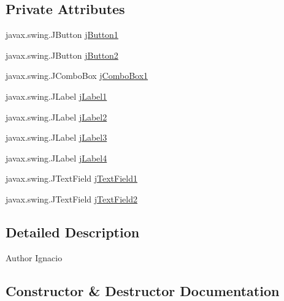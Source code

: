 \subsection*{Private Attributes}
\begin{DoxyCompactItemize}
\item 
javax.\+swing.\+J\+Button \mbox{\hyperlink{classejercicio2_1_1_camion_interfaz_a782e2170ce45db1bd1d32b61d1d7be8c}{j\+Button1}}
\item 
javax.\+swing.\+J\+Button \mbox{\hyperlink{classejercicio2_1_1_camion_interfaz_aa5f586a69f5266a210a12f6873d21657}{j\+Button2}}
\item 
javax.\+swing.\+J\+Combo\+Box \mbox{\hyperlink{classejercicio2_1_1_camion_interfaz_ad99726150fad438267d353b48c6aaf7d}{j\+Combo\+Box1}}
\item 
javax.\+swing.\+J\+Label \mbox{\hyperlink{classejercicio2_1_1_camion_interfaz_a490011dc597ba9415392ffbe2ad78bce}{j\+Label1}}
\item 
javax.\+swing.\+J\+Label \mbox{\hyperlink{classejercicio2_1_1_camion_interfaz_a4a0e429b6f6d6aeb7911a2e89cfcf384}{j\+Label2}}
\item 
javax.\+swing.\+J\+Label \mbox{\hyperlink{classejercicio2_1_1_camion_interfaz_a13844a46462d16486b33610dc0c6bb47}{j\+Label3}}
\item 
javax.\+swing.\+J\+Label \mbox{\hyperlink{classejercicio2_1_1_camion_interfaz_a4a08e18cef32cc5cc683a2d882e3fdcb}{j\+Label4}}
\item 
javax.\+swing.\+J\+Text\+Field \mbox{\hyperlink{classejercicio2_1_1_camion_interfaz_ac094ecbee7fcbad6cf54f57cceb73bdb}{j\+Text\+Field1}}
\item 
javax.\+swing.\+J\+Text\+Field \mbox{\hyperlink{classejercicio2_1_1_camion_interfaz_a08c1f3dc1cf2e8d6f09958c97ecdcd6e}{j\+Text\+Field2}}
\end{DoxyCompactItemize}


\subsection{Detailed Description}
\begin{DoxyAuthor}{Author}
Ignacio 
\end{DoxyAuthor}


\subsection{Constructor \& Destructor Documentation}
\mbox{\label{classejercicio2_1_1_camion_interfaz_a76d59d7f6e7f1f1380532327a3850ed6}} 
